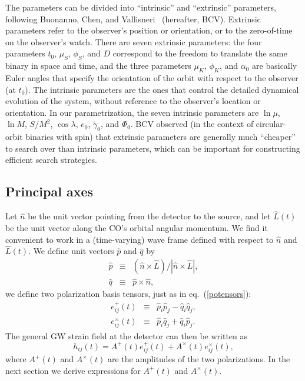 \documentclass[11pt]{report}
\begin{document}
The parameters can be divided into ``intrinsic'' and ``extrinsic''
parameters, following  Buonanno, Chen, and
Vallisneri~\cite{BCV} (hereafter, BCV).
Extrinsic parameters refer to the observer's position or orientation, or to
the zero-of-time on the observer's watch.
There are seven extrinsic parameters: the four parameters
$t_0$,  $\mu_S$, $\phi_S$, and $D$ correspond to the
freedom to translate the same binary in space and time, and
the three parameters $\mu_K$, $\phi_K$, and $\alpha_0$ are
basically Euler angles that specify the orientation of the
orbit with respect to the observer (at $t_0$).
The intrinsic parameters are the ones that control the detailed
dynamical evolution of the system, without reference to the
observer's location or orientation.
In our parametrization, the seven intrinsic parameters are
$\ln\mu$, $\ln M$, $S/M^2$, $\cos\lambda$, $e_0$, $\tilde\gamma_0$,
and $\Phi_0$.
BCV observed (in the context of circular-orbit binaries with spin) that
extrinsic parameters are generally much ``cheaper'' to search over
than intrinsic parameters, which can be important for constructing
efficient search strategies.


\subsection{Principal axes}


Let ${\hat n}$ be the unit vector pointing from the detector
to the source, and let ${ \hat L}(t)$ be the unit vector along
the CO's orbital angular momentum.
We find it convenient to work in a (time-varying) wave frame defined with
respect to ${ \hat n}$ and ${ \hat L}(t)$. We define unit vectors
${ \hat p}$ and ${ \hat q}$ by
\begin{eqnarray} \label{pq}
{ \hat p} &\equiv& ({ \hat n}\times { \hat L})/
                    |{ \hat n}\times { \hat L}|, \nonumber\\
{ \hat q} &\equiv& { \hat p} \times { \hat n},
\end{eqnarray}
we define two polarization basis tensors, just as in eq.~(\ref{potensors}):
\begin{eqnarray} \label{H}
e_{ij}^{+}(t)      & \equiv & \hat p_i \hat p_j - \hat q_i \hat q_j, \nonumber\\
e_{ij}^{\times}(t) & \equiv & \hat p_i \hat q_j + \hat q_i \hat p_j.
\end{eqnarray}
The general GW strain field at the detector can then be written as
\begin{equation} \label{hab}
h_{ij}(t)=
A^{+}(t)e_{ij}^{+}(t) + A^{\times}(t)e_{ij}^{\times}(t),
\end{equation}
where $A^{+}(t)$ and $A^{\times}(t)$ are the amplitudes of the two
polarizations.  In  the next section we derive expressions for $A^{+}(t)$ and $A^{\times}(t)$.
\end{document}
